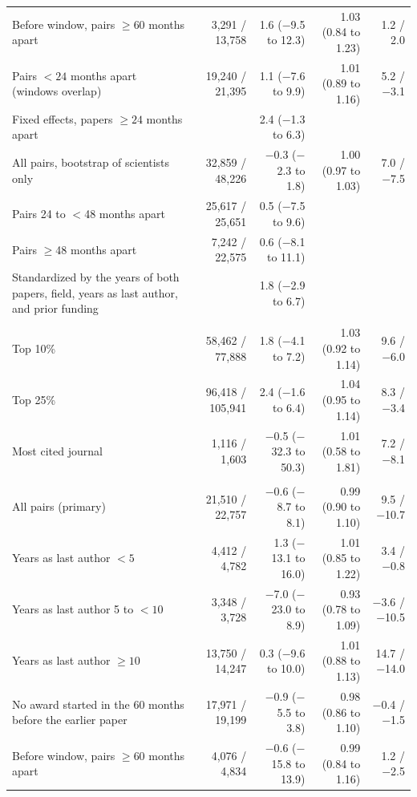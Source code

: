 \begin{table}[H]
\begin{tabularx}{\linewidth}{>{\raggedright\arraybackslash}Xrrrr}
Before window, pairs $\geq 60$ months apart & 3,291 / 13,758 & 1.6 ($-$9.5 to 12.3) & 1.03 (0.84 to 1.23) & 1.2 / 2.0 \\
Pairs $<24$ months apart (windows overlap) & 19,240 / 21,395 & 1.1 ($-$7.6 to 9.9) & 1.01 (0.89 to 1.16) & 5.2 / $-$3.1 \\
Fixed effects, papers $\geq 24$ months apart &  & 2.4 ($-$1.3 to 6.3) &  &  \\
All pairs, bootstrap of scientists only & 32,859 / 48,226 & $-$0.3 ($-$2.3 to 1.8) & 1.00 (0.97 to 1.03) & 7.0 / $-$7.5 \\
Pairs 24 to $<$48 months apart & 25,617 / 25,651 & 0.5 ($-$7.5 to 9.6) &  &  \\
Pairs $\geq$48 months apart & 7,242 / 22,575 & 0.6 ($-$8.1 to 11.1) &  &  \\
Standardized by the years of both papers, field, years as last author, and prior funding &  & 1.8 ($-$2.9 to 6.7) &  &  \\
\multicolumn{5}{>{\raggedright\arraybackslash}p{\dimexpr\textwidth-2\tabcolsep\relax}}{\textit{Other definitions of a top journal, against all other journals}} \\
Top 10\% & 58,462 / 77,888 & 1.8 ($-$4.1 to 7.2) & 1.03 (0.92 to 1.14) & 9.6 / $-$6.0 \\
Top 25\% & 96,418 / 105,941 & 2.4 ($-$1.6 to 6.4) & 1.04 (0.95 to 1.14) & 8.3 / $-$3.4 \\
Most cited journal & 1,116 / 1,603 & $-$0.5 ($-$32.3 to 50.3) & 1.01 (0.58 to 1.81) & 7.2 / $-$8.1 \\
\multicolumn{5}{>{\raggedright\arraybackslash}p{\dimexpr\textwidth-2\tabcolsep\relax}}{\textit{Top 5\% against near-top journals}} \\
All pairs (primary) & 21,510 / 22,757 & $-$0.6 ($-$8.7 to 8.1) & 0.99 (0.90 to 1.10) & 9.5 / $-$10.7 \\
Years as last author $<5$ & 4,412 / 4,782 & 1.3 ($-$13.1 to 16.0) & 1.01 (0.85 to 1.22) & 3.4 / $-$0.8 \\
Years as last author 5 to $<10$ & 3,348 / 3,728 & $-$7.0 ($-$23.0 to 8.9) & 0.93 (0.78 to 1.09) & $-$3.6 / $-$10.5 \\
Years as last author $\geq 10$ & 13,750 / 14,247 & 0.3 ($-$9.6 to 10.0) & 1.01 (0.88 to 1.13) & 14.7 / $-$14.0 \\
No award started in the 60 months before the earlier paper & 17,971 / 19,199 & $-$0.9 ($-$5.5 to 3.8) & 0.98 (0.86 to 1.10) & $-$0.4 / $-$1.5 \\
Before window, pairs $\geq 60$ months apart & 4,076 / 4,834 & $-$0.6 ($-$15.8 to 13.9) & 0.99 (0.84 to 1.16) & 1.2 / $-$2.5 \\

\end{tabularx}
\end{table}
